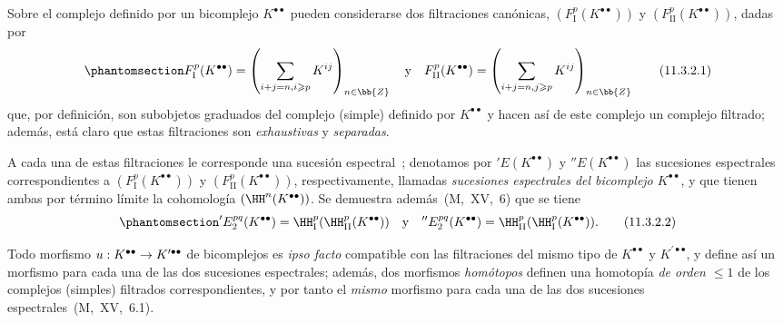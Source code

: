 \documentclass[oneside]{amsart}
\makeatletter
\renewcommand{\leq}{\leqslant}
\renewcommand{\geq}{\geqslant}
\newcommand{\ega@arrow}[2]{\mathchoice{#1}{#2}{#2}{#2}}
\renewcommand{\to}{\ega@arrow{\longrightarrow}{\rightarrow}}
\newcommand{\oldpage}[2][]{{\marginnote{\normalfont\textbf{#1}~|~#2}}\ignorespaces}
\let\EGAOriginalLabel\label
\renewcommand{\label}[1]{\phantomsection\EGAOriginalLabel{#1}}
\makeatother
\begin{document}
\begin{env}[11.3.2]
\label{0.11.3.2}
Sobre el complejo definido por un bicomplejo $K^{\bullet\bullet}$ pueden considerarse dos filtraciones canónicas, $(F_\mathrm{I}^p(K^{\bullet\bullet}))$ y $(F_\mathrm{II}^p(K^{\bullet\bullet}))$, dadas por
\[
\label{0.11.3.2.1}
  F_\mathrm{I}^p(K^{\bullet\bullet})
  = \left(\sum_{i+j=n,i\geq p}K^{ij}\right)_{n\in\bb{Z}}
  \quad\text{y}\quad
  F_\mathrm{II}^p(K^{\bullet\bullet})
  = \left(\sum_{i+j=n,j\geq p}K^{ij}\right)_{n\in\bb{Z}}
  \tag{11.3.2.1}
\]
\oldpage[0\textsubscript{III}]{30}
que, por definición, son subobjetos graduados del complejo (simple) definido por $K^{\bullet\bullet}$ y hacen así de este complejo un complejo filtrado;
además, está claro que estas filtraciones son \emph{exhaustivas} y \emph{separadas}.

A cada una de estas filtraciones le corresponde una sucesión espectral~;
denotamos por $'E(K^{\bullet\bullet})$ y $''E(K^{\bullet\bullet})$ las sucesiones espectrales correspondientes a $(F_\mathrm{I}^p(K^{\bullet\bullet}))$ y $(F_\mathrm{II}^p(K^{\bullet\bullet}))$, respectivamente, llamadas \emph{sucesiones espectrales del bicomplejo $K^{\bullet\bullet}$}, y que tienen ambas por término límite la cohomología $(\HH^n(K^{\bullet\bullet}))$.
Se demuestra además~(M,~XV,~6) que se tiene
\[
\label{0.11.3.2.2}
  'E_2^{pq}(K^{\bullet\bullet})
  = \HH_\mathrm{I}^p(\HH_\mathrm{II}^p(K^{\bullet\bullet}))
  \quad\text{y}\quad
  ''E_2^{pq}(K^{\bullet\bullet})
  = \HH_\mathrm{II}^p(\HH_\mathrm{I}^p(K^{\bullet\bullet})).
  \tag{11.3.2.2}
\]

Todo morfismo $u:K^{\bullet\bullet}\to K^{\prime\bullet\bullet}$ de bicomplejos es \emph{ipso facto} compatible con las filtraciones del mismo tipo de $K^{\bullet\bullet}$ y $K^{\prime\bullet\bullet}$, y define así un morfismo para cada una de las dos sucesiones espectrales;
además, dos morfismos \emph{homótopos} definen una homotopía \emph{de orden $\leq 1$} de los complejos (simples) filtrados correspondientes, y por tanto el \emph{mismo} morfismo para cada una de las dos sucesiones espectrales~(M,~XV,~6.1).
\end{env}
\end{document}
